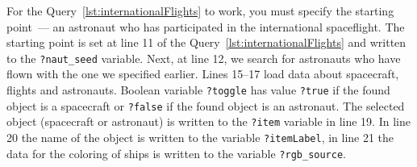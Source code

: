 
For the Query~\ref{lst:internationalFlights} to work, you must specify the starting point~--- an astronaut who has participated in the international spaceflight. The starting point is set at line 11 of the Query~\ref{lst:internationalFlights} and written to the \mbox{\lstinline|?naut_seed|} variable. Next, at line 12, we search for astronauts who have flown with the one we specified earlier. Lines 15--17 load data about spacecraft, flights and astronauts. Boolean variable \lstinline|?toggle| has value \lstinline|?true| if the found object is a spacecraft or \lstinline|?false| if the found object is an astronaut. The selected object (spacecraft or astronaut) is written to the \lstinline|?item| variable in line 19. In line 20 the name of the object is written to the variable \lstinline|?itemLabel|, in line 21 the data for the coloring of ships is written to the variable \mbox{\lstinline|?rgb_source|}. 

